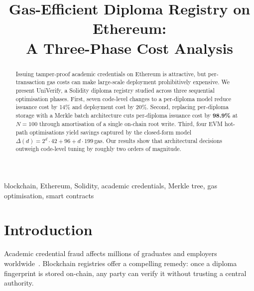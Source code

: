 \documentclass[conference]{IEEEtran}
\begin{document}
\title{Gas-Efficient Diploma Registry on Ethereum:\\
A Three-Phase Cost Analysis}

\author{
}

\maketitle

\begin{abstract}
Issuing tamper-proof academic credentials on Ethereum is attractive,
but per-transaction gas costs can make large-scale deployment
prohibitively expensive.
We present UniVerify, a Solidity diploma registry studied across
three sequential optimisation phases.
First, seven code-level changes to a per-diploma model reduce issuance
cost by 14\% and deployment cost by 20\%.
Second, replacing per-diploma storage with a Merkle batch architecture
cuts per-diploma issuance cost by \textbf{98.9\%} at $N=100$
through amortisation of a single on-chain root write.
Third, four EVM hot-path optimisations yield savings captured by the
closed-form model $\Delta(d)=2^d\!\cdot\!42+96+d\!\cdot\!199$\,gas.
Our results show that architectural decisions outweigh code-level
tuning by roughly two orders of magnitude.
\end{abstract}

\begin{IEEEkeywords}
blockchain, Ethereum, Solidity, academic credentials,
Merkle tree, gas optimisation, smart contracts
\end{IEEEkeywords}

\section{Introduction}

Academic credential fraud affects millions of graduates and
employers worldwide~\cite{grech2017blockchain}.
Blockchain registries offer a compelling remedy: once a diploma
fingerprint is stored on-chain, any party can verify it
without trusting a central authority.
\end{document}
